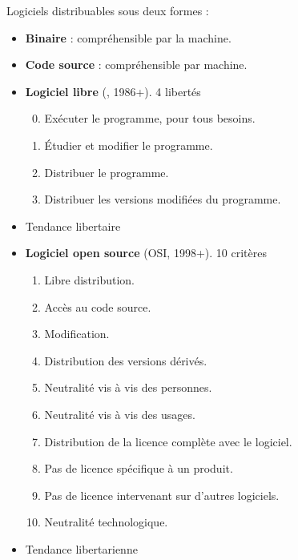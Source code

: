 \begin{slide}
	Logiciels distribuables sous deux formes :
	\begin{itemize}
		\item \textbf{Binaire} : compréhensible par la machine.
		\item \textbf{Code source} : compréhensible par machine.
	\end{itemize}

\end{slide}

\begin{slide}
	\begin{itemize}
		\item \textbf{Logiciel libre} (, 1986+). 4 libertés
		\begin{enumerate}
		\setcounter{enumi}{-1}
			\item Exécuter le programme, pour tous besoins.
			\item Étudier et modifier le programme.
			\item Distribuer le programme.
			\item Distribuer les versions modifiées du programme.
		\end{enumerate}
		\item Tendance libertaire
	\end{itemize}

\end{slide} 

\begin{slide}
	\begin{itemize}
		\item \textbf{Logiciel open source} (OSI, 1998+). 10 critères
			\begin{enumerate}
				\item Libre distribution.
				\item Accès au code source.
				\item Modification.
				\item Distribution des versions dérivés.
				\item Neutralité vis à vis des  personnes.
				\item Neutralité vis à vis des usages.
				\item Distribution de la licence complète avec le logiciel.
				\item Pas de licence spécifique à un produit.
				\item Pas de licence intervenant sur d'autres logiciels.
				\item Neutralité technologique.
			\end{enumerate}
		\item Tendance libertarienne
	\end{itemize}
\end{slide}

